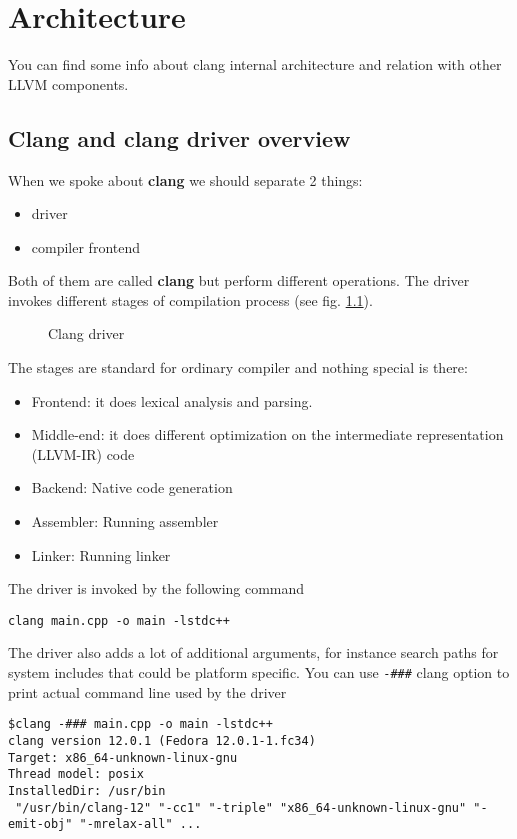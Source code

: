 \chapter{Architecture}

You can find some info about clang internal architecture and relation
with other LLVM components.

\section{Clang and clang driver overview}

When we spoke about \textbf{clang} we should separate 2 things:
\begin{itemize}
\item driver
\item compiler frontend 
\end{itemize}
Both of them are called \textbf{clang} but perform different
operations. The driver invokes different stages of compilation process
(see fig. \ref{fig:clang_driver}). 
\begin{figure}
\begin{center}
\end{center}
  \caption{Clang driver}
  \label{fig:clang_driver}
\end{figure}
The stages are standard for ordinary compiler and nothing special is
there:
\begin{itemize}
\item Frontend: it does lexical analysis and parsing.
\item Middle-end: it does different optimization on the intermediate
  representation (LLVM-IR) code
\item Backend: Native code generation
\item Assembler: Running assembler
\item Linker: Running linker
\end{itemize}

The driver is invoked by the following command
\begin{verbatim}
clang main.cpp -o main -lstdc++
\end{verbatim}
The driver also adds a lot of additional arguments, for instance
search paths for system includes that could be platform specific.
You can use \texttt{-###} clang option to print actual
command line used by the driver
\begin{verbatim}
$clang -### main.cpp -o main -lstdc++
clang version 12.0.1 (Fedora 12.0.1-1.fc34)
Target: x86_64-unknown-linux-gnu
Thread model: posix
InstalledDir: /usr/bin
 "/usr/bin/clang-12" "-cc1" "-triple" "x86_64-unknown-linux-gnu" "-emit-obj" "-mrelax-all" ...
\end{verbatim}


